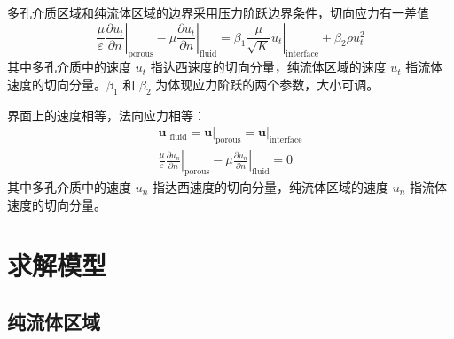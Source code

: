 多孔介质区域和纯流体区域的边界采用压力阶跃边界条件，切向应力有一差值
\begin{equation}
	\left.\frac{\mu}{\varepsilon}\frac{\partial u_t}{\partial n}\right|_{\mathrm{porous}} -
	\left.\mu\frac{\partial u_t}{\partial n}\right|_{\mathrm{fluid}} =
	\left.\beta_1\frac{\mu}{\sqrt K}u_t\right|_{\mathrm{interface}} + \beta_2\rho u_t^2
\end{equation}
其中多孔介质中的速度 $u_t$ 指达西速度的切向分量，纯流体区域的速度 $u_t$ 指流体速度的切向分量。$\beta_1$ 和 $\beta_2$ 为体现应力阶跃的两个参数，大小可调。

界面上的速度相等，法向应力相等：
\begin{gather}
	\bm{u}|_{\mathrm{fluid}} = \bm{u}|_{\mathrm{porous}} = \bm{u}|_{\mathrm{interface}} \\
	\left.\frac{\mu}{\varepsilon}\frac{\partial u_n}{\partial n}\right|_{\mathrm{porous}} -
	\left.\mu\frac{\partial u_n}{\partial n}\right|_{\mathrm{fluid}} = 0
\end{gather}
其中多孔介质中的速度 $u_n$ 指达西速度的切向分量，纯流体区域的速度 $u_n$ 指流体速度的切向分量。




\section{求解模型}\label{sec: model} %

\subsection{纯流体区域}

